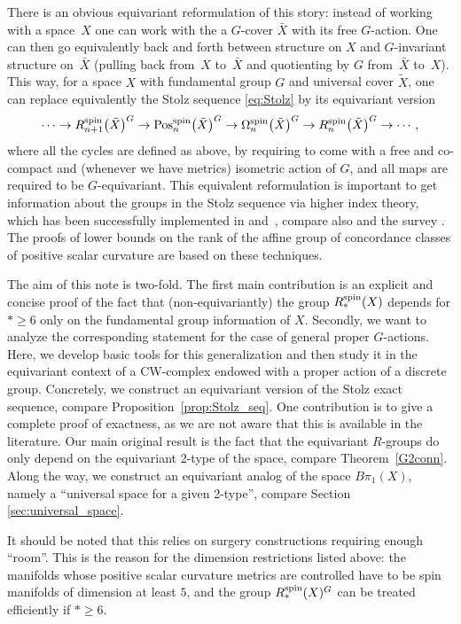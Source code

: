 \documentclass[pdftex]{sigma}
\numberwithin{equation}{section}
\begin{document}
There is an obvious equivariant reformulation of this story: instead of
working with a space~$X$ one can work with the a $G$-cover $\bar X$ with its free
$G$-action. One can then go equivalently back and forth between structure on
$X$ and $G$-invariant structure on~$\bar X$ (pulling back from~$X$ to~$\bar X$
and quotienting by $G$ from~$\bar X$ to~$X$). This way, for a space $X$ with
fundamental group $G$ and universal cover $\tilde{X}$, one can replace equivalently the Stolz sequence
\eqref{eq:Stolz} by its equivariant version
\[%
	\cdots \to R^{\rm spin}_{n+1}\bigl(\tilde X\bigr)^G \to
	\mathrm{Pos}^{\rm spin}_n\bigl(\tilde X\bigr)^G \to \Omega^{\rm spin}_n\bigl(\tilde X\bigr)^G
	\to R^{\rm spin}_n\bigl(\tilde X\bigr)^G \to \cdots,
\]
where all the cycles are defined as above, by requiring to come with a free and
co-compact and (whenever we have metrics) isometric action of $G$, and all maps
are required to be $G$-equivariant. This equivalent reformulation is important to get information about
the groups in the Stolz sequence via higher index theory, which has been
successfully implemented in \cite{PiazzaSchick} and~\cite{Zeidler}, compare
also \cite{XieYu} and the survey \cite{SchickICM}. The proofs of lower bounds
on the rank of the affine group
of concordance classes of positive scalar curvature are based on these techniques.

The aim of this note is two-fold. The first main contribution is an explicit
and
concise proof of the fact that (non-equivariantly) the group $R^{\rm spin}_*(X)$
depends for $*\ge 6$ only on the
fundamental group information of $X$. Secondly, we want to analyze the
corresponding statement for the case of general
proper $G$-actions. Here, we develop basic tools for this
generalization and then study it in the equivariant context of a CW-complex endowed with a proper
action of a discrete group. Concretely, we construct an equivariant
version of the Stolz exact sequence, compare Proposition~\ref{prop:Stolz_seq}.
One contribution is to give a complete proof of exactness, as we are not aware
that this is available in the literature. Our main original result is the fact
that the equivariant $R$-groups do only depend on the equivariant 2-type of the
space, compare Theorem~\ref{G2conn}. Along the way, we construct an
equivariant analog of the space $B\pi_1(X)$, namely a ``universal space for a
given 2-type'', compare Section \ref{sec:universal_space}.

It should be noted that this relies on surgery constructions requiring
enough ``room''. This is the reason for the dimension restrictions listed
above: the manifolds whose positive scalar curvature metrics are controlled
have to be spin manifolds of dimension at least $5$, and the group
$R^{\rm spin}_*(X)^G$ can be treated efficiently if $*\ge 6$.
\end{document}
